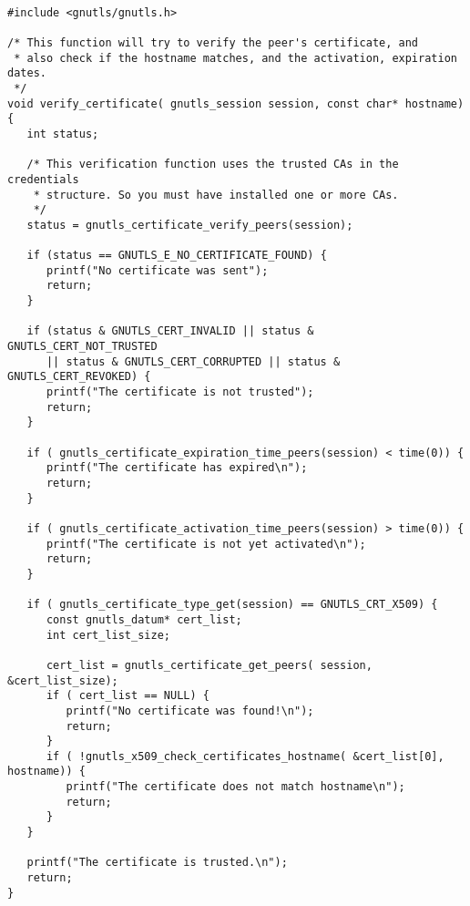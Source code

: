 \label{ex:rfc2818}

\begin{verbatim}

#include <gnutls/gnutls.h>

/* This function will try to verify the peer's certificate, and
 * also check if the hostname matches, and the activation, expiration dates.
 */
void verify_certificate( gnutls_session session, const char* hostname)
{
   int status;

   /* This verification function uses the trusted CAs in the credentials
    * structure. So you must have installed one or more CAs.
    */
   status = gnutls_certificate_verify_peers(session);

   if (status == GNUTLS_E_NO_CERTIFICATE_FOUND) {
      printf("No certificate was sent");
      return;
   }

   if (status & GNUTLS_CERT_INVALID || status & GNUTLS_CERT_NOT_TRUSTED
      || status & GNUTLS_CERT_CORRUPTED || status & GNUTLS_CERT_REVOKED) {
      printf("The certificate is not trusted");
      return;
   }

   if ( gnutls_certificate_expiration_time_peers(session) < time(0)) {
      printf("The certificate has expired\n");
      return;
   }

   if ( gnutls_certificate_activation_time_peers(session) > time(0)) {
      printf("The certificate is not yet activated\n");
      return;
   }

   if ( gnutls_certificate_type_get(session) == GNUTLS_CRT_X509) {
      const gnutls_datum* cert_list;
      int cert_list_size;
      
      cert_list = gnutls_certificate_get_peers( session, &cert_list_size);
      if ( cert_list == NULL) {
         printf("No certificate was found!\n");
         return;
      }
      if ( !gnutls_x509_check_certificates_hostname( &cert_list[0], hostname)) {
         printf("The certificate does not match hostname\n");
         return;
      }
   }
   
   printf("The certificate is trusted.\n");
   return;
}

\end{verbatim}
